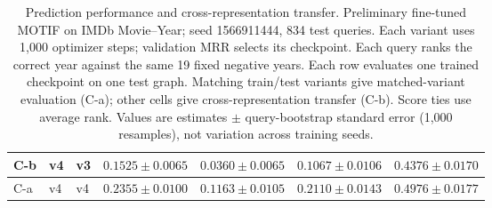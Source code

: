 \begin{table}[htbp]
\begin{adjustbox}{max width=\linewidth}
\begin{tabular}{|l|l|l|l|l|l|l|}
\hline
C-b & v4 & v3 & $0.1525 \pm 0.0065$ & $0.0360 \pm 0.0065$ & $0.1067 \pm 0.0106$ & $0.4376 \pm 0.0170$ \\
\hline
C-a & v4 & v4 & $0.2355 \pm 0.0100$ & $0.1163 \pm 0.0105$ & $0.2110 \pm 0.0143$ & $0.4976 \pm 0.0177$ \\
\hline
\end{tabular}
\end{adjustbox}
\caption{Prediction performance and cross-representation transfer. Preliminary fine-tuned MOTIF on IMDb Movie--Year; seed 1566911444, 834 test queries. Each variant uses 1,000 optimizer steps; validation MRR selects its checkpoint. Each query ranks the correct year against the same 19 fixed negative years. Each row evaluates one trained checkpoint on one test graph. Matching train/test variants give matched-variant evaluation (C-a); other cells give cross-representation transfer (C-b). Score ties use average rank. Values are estimates $\pm$ query-bootstrap standard error (1,000 resamples), not variation across training seeds.}
\label{tab:motif-imdb-movie-year-matrix-transfer-performance}
\end{table}
